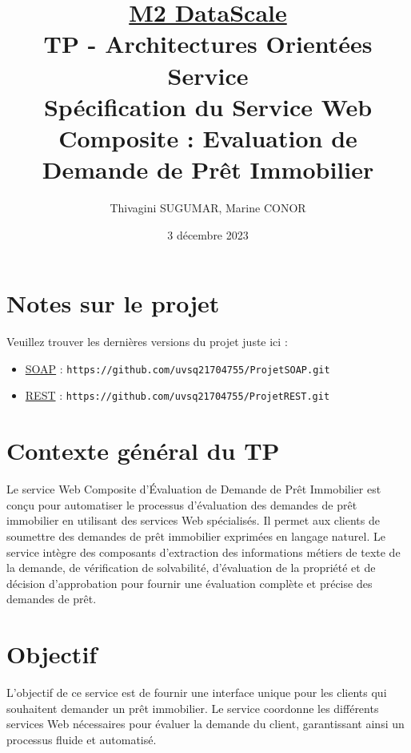 \documentclass{article}
\begin{document}
	\author{Thivagini SUGUMAR, Marine CONOR}
	\date{3 décembre 2023}
	
	\title{\underline{\textbf{M2 DataScale}}\\
		\bigskip
		\textbf{TP - Architectures Orientées Service}\\
		\bigskip
		Spécification du Service Web Composite : Evaluation de Demande de Prêt Immobilier
		\bigskip}
	
	\maketitle
	\newpage
	\tableofcontents
	\newpage
	\section{Notes sur le projet}
    Veuillez trouver les dernières versions du projet juste ici : 	
    \begin{itemize}
	 	\item \textcolor{blue}{\href{https://github.com/uvsq21704755/ProjetSOAP.git}{SOAP}} : \texttt{https://github.com/uvsq21704755/ProjetSOAP.git}
	 	\item \textcolor{blue}{\href{https://github.com/uvsq21704755/ProjetREST.git}{REST}} : \texttt{https://github.com/uvsq21704755/ProjetREST.git}
	 \end{itemize}
	\section{Contexte général du TP}
	Le service Web Composite d'Évaluation de Demande de Prêt Immobilier est conçu pour automatiser le processus d'évaluation des demandes de prêt immobilier en utilisant des services Web spécialisés. 
	\newline Il permet aux clients de soumettre des demandes de prêt immobilier exprimées en langage naturel. Le service intègre des composants d’extraction des informations métiers de texte de la demande, de vérification de solvabilité, d'évaluation de la propriété et de décision d'approbation pour fournir une évaluation complète et précise des demandes de prêt. 
	
	\section{Objectif}
	L'objectif de ce service est de fournir une interface unique pour les clients qui souhaitent demander un prêt immobilier. Le service coordonne les différents services Web nécessaires pour évaluer la demande du client, garantissant ainsi un processus fluide et automatisé.
	
\end{document}

